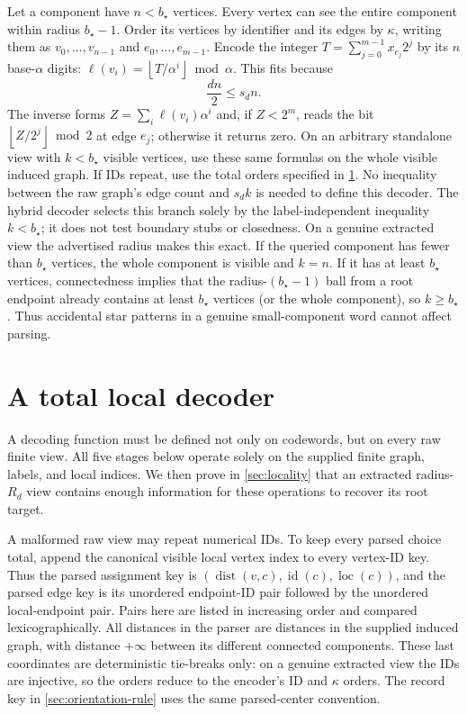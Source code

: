 \documentclass[11pt]{article}
\theoremstyle{definition}
\theoremstyle{remark}
\newcommand{\id}{\operatorname{id}}
\newcommand{\dist}{\operatorname{dist}}
\newcommand{\floor}[1]{\left\lfloor #1\right\rfloor}
\begin{document}
Let a component have $n<b_\star$ vertices.  Every vertex can see the entire
component within radius $b_\star-1$.  Order its vertices by identifier and
its edges by $\kappa$, writing them as $v_0,\ldots,v_{n-1}$ and
$e_0,\ldots,e_{m-1}$.  Encode the integer
$T=\sum_{j=0}^{m-1}x_{e_j}2^j$ by its $n$ base-$\alpha$ digits:
$\ell(v_i)=\floor{T/\alpha^i}\bmod\alpha$.  This fits because
\[
                         \frac{dn}{2}\le s_d n.                 \tag{8.1}
\]
The inverse forms $Z=\sum_i\ell(v_i)\alpha^i$ and, if $Z<2^m$, reads
the bit $\floor{Z/2^j}\bmod2$ at edge $e_j$; otherwise it returns zero.
On an arbitrary standalone view with $k<b_\star$ visible vertices, use
these same formulas on the whole visible induced graph.  If IDs repeat,
use the total orders specified in \cref{sec:decoder}.  No inequality between
the raw graph's edge count and $s_dk$ is needed to define this decoder.
The hybrid
decoder selects this branch solely by the label-independent inequality
$k<b_\star$; it does not test boundary stubs or closedness.  On a genuine
extracted view the advertised radius makes this exact.  If the queried
component has fewer than $b_\star$ vertices, the whole component is visible
and $k=n$.  If it has at least $b_\star$ vertices, connectedness implies that
the radius-$(b_\star-1)$ ball from a root endpoint already contains at least
$b_\star$ vertices (or the whole component), so $k\ge b_\star$.  Thus
accidental star patterns in a genuine small-component word cannot affect
parsing.

\section{A total local decoder}
\label{sec:decoder}

A decoding function must be defined not only on codewords, but on every
raw finite view.  All five stages below operate solely on the supplied
finite graph, labels, and local indices.  We then prove in
\cref{sec:locality} that an extracted radius-$R_d$ view contains enough
information for these operations to recover its root target.

A malformed raw view may repeat numerical IDs.  To keep every parsed choice
total, append the canonical visible local vertex index to every vertex-ID
key.  Thus the parsed assignment key is
$(\dist(v,c),\id(c),\operatorname{loc}(c))$, and the parsed edge key is its
unordered endpoint-ID pair followed by the unordered local-endpoint pair.
Pairs here are listed in increasing order and compared lexicographically.
All distances in the parser are distances in the supplied induced graph,
with distance $+\infty$ between its different connected components.
These last coordinates are deterministic tie-breaks only: on a genuine
extracted view the IDs are injective, so the orders reduce to the encoder's
ID and $\kappa$ orders.  The record key in \cref{sec:orientation-rule} uses
the same parsed-center convention.
\end{document}

